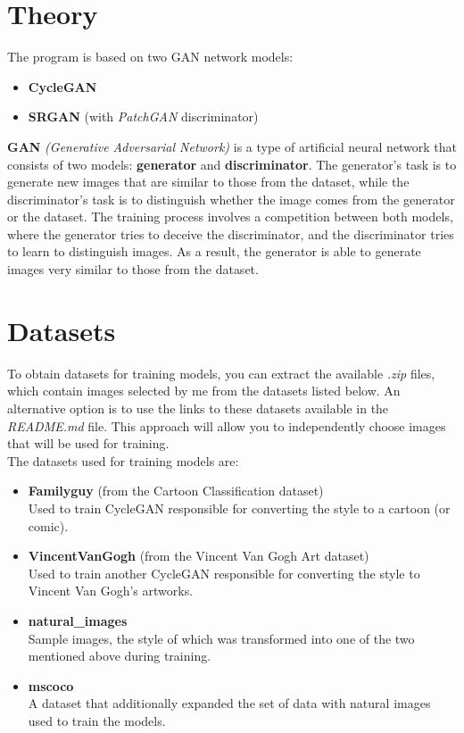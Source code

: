 \documentclass{article}
\begin{document}
\section{Theory}
The program is based on two GAN network models:
\begin{itemize}
    \setlength\itemsep{0pt}
    \item \textbf{CycleGAN}
    \item \textbf{SRGAN} (with \textit{PatchGAN} discriminator)
\end{itemize}
\textbf{GAN} \textit{(Generative Adversarial Network)} is a type of artificial neural network that consists of two models: \textbf{generator} and \textbf{discriminator}.
The generator's task is to generate new images that are similar to those from the dataset, while the discriminator's task is to distinguish whether the image comes from the generator or the dataset.
The training process involves a competition between both models, where the generator tries to deceive the discriminator, and the discriminator tries to learn to distinguish images.
As a result, the generator is able to generate images very similar to those from the dataset.

\section{Datasets}
To obtain datasets for training models, you can extract the available \textit{.zip} files, which contain images selected by me from the datasets listed below. An alternative option is to use the links to these datasets available in the \textit{README.md} file. This approach will allow you to independently choose images that will be used for training.
\vspace{3mm} \\
The datasets used for training models are:
\begin{itemize}
    \item \textbf{Familyguy} (from the Cartoon Classification dataset) \\
Used to train CycleGAN responsible for converting the style to a cartoon (or comic).
    \item \textbf{VincentVanGogh} (from the Vincent Van Gogh Art dataset) \\
Used to train another CycleGAN responsible for converting the style to Vincent Van Gogh's artworks.
    \item \textbf{natural\_images} \\
Sample images, the style of which was transformed into one of the two mentioned above during training.
    \item \textbf{mscoco} \\
A dataset that additionally expanded the set of data with natural images used to train the models.
\end{itemize}
\end{document}
